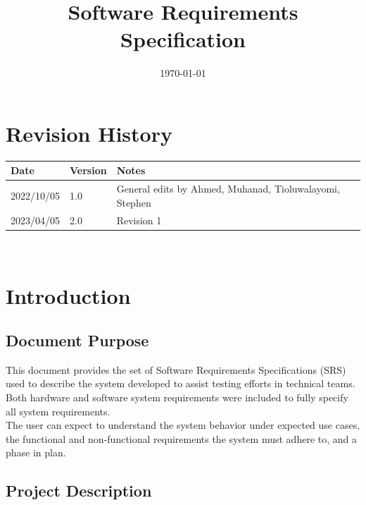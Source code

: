 \documentclass[12pt,titlepage]{article}
\begin{document}
\title{\huge Software Requirements Specification \\ \progname} 

\author{\authname}
\date{\today}
	
\maketitle


\newpage
\section*{Revision History}

\begin{tabularx}{\textwidth}{p{3cm}p{2cm}X}
\toprule {\bf Date} & {\bf Version} & {\bf Notes}\\
\midrule
2022/10/05 & 1.0 & General edits by Ahmed, Muhanad, Tioluwalayomi, Stephen\\
2023/04/05 & 2.0 & Revision 1\\
\bottomrule
\end{tabularx}
\newpage

\tableofcontents

\listoffigures

~\newpage



\section{Introduction}

\subsection{Document Purpose}

This document provides the set of Software Requirements Specifications (SRS) used to describe the system developed to assist testing efforts in technical teams. Both hardware and software system requirements were included to fully specify all system requirements. \\

The user can expect to understand the system behavior under expected use cases, the functional and non-functional requirements the system must adhere to, and a phase in plan.\\

\subsection{Project Description}
\end{document}
